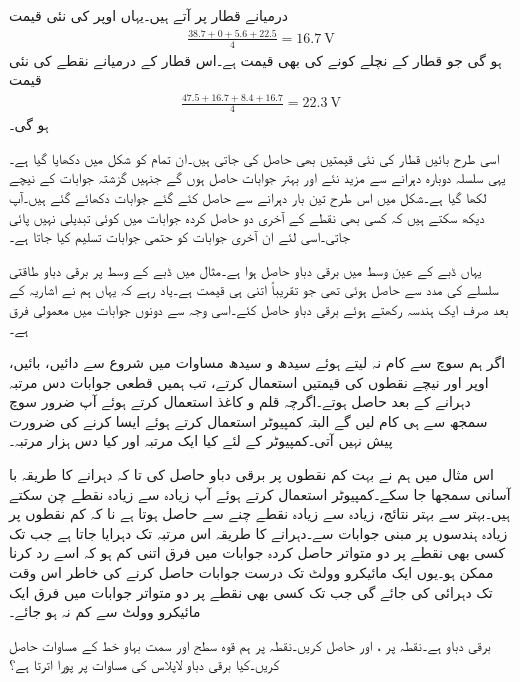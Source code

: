 درمیانے قطار پر آتے ہیں۔یہاں اوپر  کی نئی قیمت
\begin{align*}
\frac{38.7+0+5.6+22.5}{4}=\SI{16.7}{\volt}
\end{align*}
ہو گی جو قطار کے  نچلے کونے کی بھی قیمت ہے۔اس قطار کے درمیانے نقطے کی نئی قیمت
\begin{align*}
\frac{47.5+16.7+8.4+16.7}{4}=\SI{22.3}{\volt}
\end{align*}
ہو گی۔

اسی طرح بائیں قطار  کی نئی قیمتیں بھی حاصل کی جاتی ہیں۔ان تمام کو شکل  میں دکھایا گیا ہے۔یہی سلسلہ دوبارہ دہرانے سے مزید نئے اور بہتر جوابات حاصل ہوں گے جنہیں گزشتہ جوابات کے نیچے لکھا گیا ہے۔شکل میں اس طرح تین بار دہرانے سے حاصل کئے گئے جوابات دکھائے گئے ہیں۔آپ دیکھ سکتے ہیں کہ کسی بھی نقطے کے آخری دو حاصل کردہ جوابات میں کوئی تبدیلی نہیں پائی جاتی۔اسی لئے ان آخری جوابات کو حتمی جوابات تسلیم کیا جاتا ہے۔

یہاں ڈبے کے عین وسط میں برقی دباو  حاصل ہوا ہے۔مثال  میں ڈبے کے وسط پر برقی دباو طاقتی سلسلے کی مدد سے  حاصل ہوئی تھی جو تقریباً اتنی ہی قیمت ہے۔یاد رہے کہ یہاں ہم نے اشاریہ کے بعد صرف ایک ہندسہ رکھتے ہوئے برقی دباو حاصل کئے۔اسی وجہ سے دونوں جوابات میں معمولی فرق ہے۔ 

اگر ہم سوچ سے کام نہ لیتے ہوئے سیدھ و سیدھ مساوات  میں شروع سے دائیں، بائیں، اوپر اور نیچے نقطوں کی قیمتیں استعمال کرتے، تب ہمیں قطعی جوابات دس مرتبہ دہرانے کے بعد حاصل ہوتے۔اگرچہ قلم و کاغذ استعمال کرتے ہوئے آپ ضرور سوچ سمجھ سے ہی کام لیں گے البتہ کمپیوٹر استعمال کرتے ہوئے ایسا کرنے کی ضرورت پیش نہیں آتی۔کمپیوٹر کے لئے کیا ایک مرتبہ اور کیا دس ہزار مرتبہ۔

اس مثال میں ہم نے بہت کم نقطوں پر برقی دباو حاصل کی تا کہ دہرانے کا طریقہ با آسانی سمجھا جا سکے۔کمپیوٹر استعمال کرتے ہوئے آپ زیادہ سے زیادہ نقطے چن سکتے ہیں۔بہتر سے بہتر نتائج، زیادہ سے زیادہ نقطے چنے سے حاصل ہوتا ہے نا کہ کم نقطوں پر زیادہ ہندسوں پر مبنی جوابات سے۔دہرانے کا طریقہ اس مرتبہ تک دہرایا جاتا ہے جب تک کسی بھی نقطے پر دو متواتر حاصل کردہ جوابات میں فرق اتنی کم ہو کہ اسے رد کرنا ممکن ہو۔یوں ایک مائیکرو وولٹ تک درست جوابات حاصل کرنے کی خاطر اس وقت تک دہرائی کی جائے گی جب تک کسی بھی نقطے پر دو متواتر جوابات میں فرق ایک مائیکرو وولٹ سے کم نہ ہو جائے۔    

\newpage

برقی دباو  ہے۔نقطہ  پر ،  اور  حاصل کریں۔نقطہ  پر ہم قوہ سطح اور سمت بہاو خط کے مساوات حاصل کریں۔کیا برقی دباو لاپلاس کی مساوات پر پورا اترتا ہے؟

